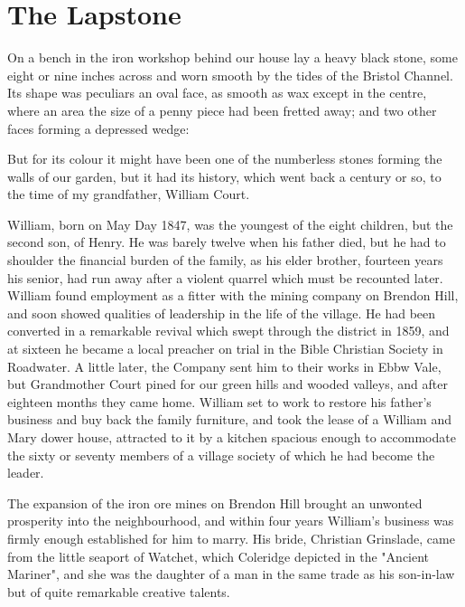 \section{The Lapstone}

On a bench in the iron workshop behind our house lay a heavy black stone, some eight or nine inches across and worn smooth by the tides of the Bristol Channel. Its shape was peculiars an oval face, as smooth as wax except in the centre, where an area the size of a penny piece had been fretted away; and two other faces forming a depressed wedge:

But for its colour it might have been one of the numberless stones forming the walls of our garden, but it had its history, which went back a century or so, to the time of my grandfather, William Court.

William, born on May Day 1847, was the youngest of the eight children, but the second son, of Henry. He was barely twelve when his father died, but he had to shoulder the financial burden of the family, as his elder brother, fourteen years his senior, had run away after a violent quarrel which must be recounted later. William found employment as a fitter with the mining company on Brendon Hill, and soon showed qualities of leadership in the life of the village. He had been converted in a remarkable revival which swept through the district in 1859, and at sixteen he became a local preacher on trial in the Bible Christian Society in Roadwater. A little later, the Company sent him to their works in Ebbw Vale, but Grandmother Court pined for our green hills and wooded valleys, and after eighteen months they came home. William set to work to restore his father's business and buy back the family furniture, and took the lease of a William and Mary dower house, attracted to it by a kitchen spacious enough to accommodate the sixty or seventy members of a village society of which he had become the leader.

The expansion of the iron ore mines on Brendon Hill brought an unwonted prosperity into the neighbourhood, and within four years William's business was firmly enough established for him to marry. His bride, Christian Grinslade, came from the little seaport of Watchet, which Coleridge depicted in the "Ancient Mariner", and she was the daughter of a man in the same trade as his son-in-law but of quite remarkable creative talents.

